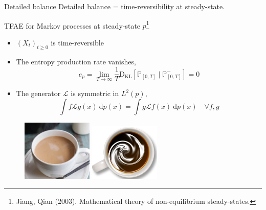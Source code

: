 \documentclass{beamer}
\newcommand{\p}{\mathbb P}
\newcommand{\dkl}{\operatorname{D_{K L}}}
\renewcommand{\d}{\: \mathrm{d}}
\begin{document}
\begin{frame}{Detailed balance}
    Detailed balance = time-reversibility at steady-state.
    \vspace{10pt}
    
        TFAE for Markov processes at steady-state $p$\footnote{Jiang, Qian (2003). Mathematical theory of non-equilibrium steady-states.}
    \begin{itemize}
        \item $(X_t)_{t \geq 0}$ is time-reversible
        \item The entropy production rate vanishes,
                    $$e_p = \lim_{T\to \infty} \frac{1}{T}\dkl[\p_{[0,T]} \mid \p^-_{[0,T]} ]=0$$
        \item The generator $\mathcal L$ is symmetric in $L^2(p)$,
        $$ \int f \mathcal L g (x) \d p(x) = \int g \mathcal L f(x) \d p(x) \quad \forall f,g$$
    \end{itemize}
        \begin{figure}
        \centering
        \includegraphics[width=0.3\textwidth]{coffee-cream-equilibrium.jpg}
        \includegraphics[width=0.3\textwidth]{Coffee-cream-vortex.png}
    \end{figure}
\end{frame}
\end{document}
